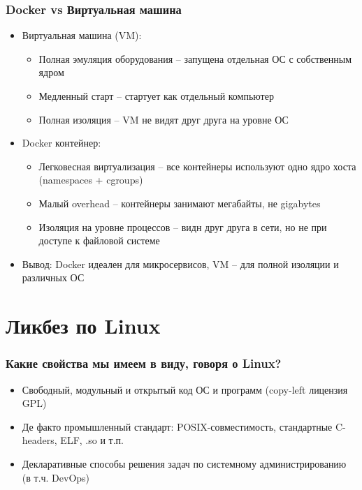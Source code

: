 \documentclass{beamer}
\begin{document}
\begin{frame}
\frametitle{Docker vs Виртуальная машина}

\begin{itemize}
  \item Виртуальная машина (VM):
  \begin{itemize}
    \item Полная эмуляция оборудования – запущена отдельная ОС с собственным ядром
    \item Медленный старт – стартует как отдельный компьютер
    \item Полная изоляция – VM не видят друг друга на уровне ОС
  \end{itemize}
  \item Docker контейнер:
  \begin{itemize}
    \item Легковесная виртуализация – все контейнеры используют одно ядро хоста (namespaces + cgroups)
    \item Малый overhead – контейнеры занимают мегабайты, не gigabytes
    \item Изоляция на уровне процессов – видн друг друга в сети, но не при доступе к файловой системе
  \end{itemize}
  \item Вывод: Docker идеален для микросервисов, VM – для полной изоляции и различных ОС
\end{itemize}

\end{frame}

\section{Ликбез по Linux}

\begin{frame}
\frametitle{Какие свойства мы имеем в виду, говоря о Linux?}

\begin{itemize}
	\item Свободный, модульный и открытый код ОС и программ (copy-left лицензия GPL)
	\item Де факто промышленный стандарт: POSIX-совместимость, стандартные C-headers, ELF, .so и т.п.
	\item Декларативные способы решения задач по системному администрированию (в т.ч. DevOps)
\end{itemize}

\end{frame}
\end{document}
